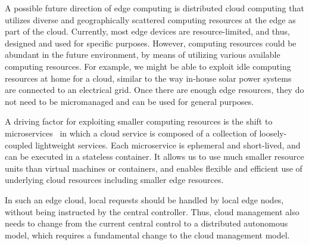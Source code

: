 
A possible future direction of edge computing is distributed cloud
computing that utilizes diverse and geographically scattered computing
resources at the edge as part of the cloud.
Currently, most edge devices are resource-limited, and thus, designed
and used for specific purposes.
However, computing resources could be abundant in the future environment,
by means of utilizing various available computing resources.
For example, we might be able to exploit idle computing resources at
home for a cloud, similar to the way in-house solar power systems are
connected to an electrical grid.
Once there are enough edge resources, they do not need to be
micromanaged and can be used for general purposes.

A driving factor for exploiting smaller computing resources
is the shift to microservices~\cite{nadareishvili2016microservice}
in which a cloud service is composed of a collection of loosely-coupled
lightweight services.
Each microservice is ephemeral and short-lived, and can be executed
in a stateless container.
It allows us to use much smaller resource units than virtual machines
or containers, and enables flexible and efficient use of underlying cloud
resources including smaller edge resources.

In such an edge cloud, local requests should be handled by local edge
nodes, without being instructed by the central controller.
Thus, cloud management also needs to change from the current central
control to a distributed autonomous model, which requires a
fundamental change to the cloud management model.


